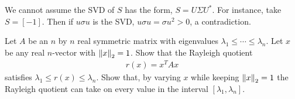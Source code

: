 \documentclass[10pt]{article}
\begin{document}
\begin{solution}[Solution]
We cannot assume the SVD of \( S \) has the form, \( S = U\Sigma U^* \). For instance, take \( S = [-1] \). Then if \( u\sigma u \) is the SVD, \( u\sigma u = \sigma u^2 > 0 \), a contradiction.
\end{solution}

\begin{problem}
Let \( A \) be an \( n \) by \( n \) real symmetric matrix with eigenvalues \( \lambda_1 \leq \cdots \leq \lambda_n \). Let \( x \) be any real \( n \)-vector with \( \left\lVert x\right\rVert_2 = 1 \). Show that the Rayleigh quotient
\begin{align*}
    r(x) = x^TAx
\end{align*}
satisfies \( \lambda_1 \leq r(x) \leq \lambda_n \). Show that, by varying \( x \) while keeping \( \left\lVert x\right\rVert_2 = 1 \) the Rayleigh quotient can take on every value in the interval \( [\lambda_1,\lambda_n] \).
\end{problem}
\end{document}
